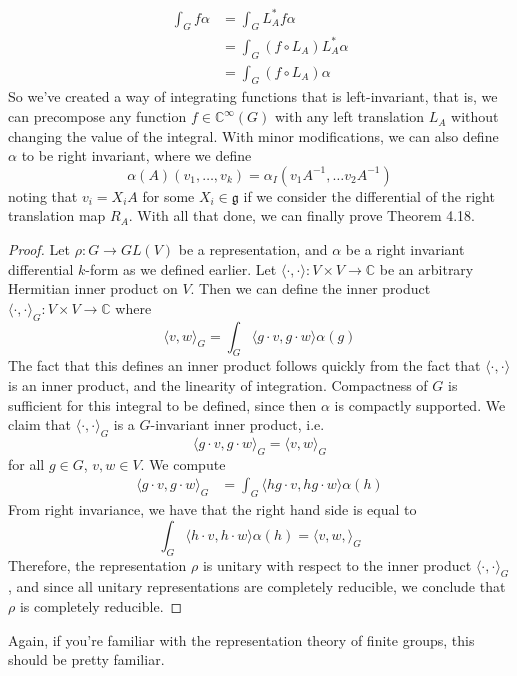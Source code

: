 \documentclass[psamsfonts]{amsart}
\theoremstyle{definition}
\theoremstyle{remark}
\newcommand{\C}{\mathbb{C}}
\newcommand{\g}{\mathfrak{g}}
\newcommand{\inv}{^{-1}}
\begin{document}
\begin{align*}
\int_G f\alpha &= \int_G L_A^*f\alpha \\
&= \int_G (f \circ L_A)L^*_A\alpha \\
&= \int_G (f \circ L_A)\alpha
\end{align*}
So we've created a way of integrating functions that is left-invariant, that is, we can precompose any function $f \in \C^\infty(G)$ with any left translation $L_A$ without changing the value of the integral. With minor modifications, we can also define $\alpha$ to be right invariant, where we define
$$\alpha(A)(v_1, \ldots, v_k) = \alpha_I(v_1A\inv, \ldots v_2A\inv) $$ 
noting that $v_i = X_iA$ for some $X_i \in \g$ if we consider the differential of the right translation map $R_A$. With all that done, we can finally prove Theorem 4.18.
\begin{proof}
Let $\rho: G \to GL(V)$ be a representation, and $\alpha$ be a right invariant differential $k$-form as we defined earlier. Let $\langle \cdot, \cdot \rangle:V\times V \to \C$ be an arbitrary Hermitian inner product on $V$. Then we can define the inner product $\langle \cdot, \cdot \rangle_G: V\times V \to \C$ where
$$\langle v, w \rangle_G = \int_G \langle g \cdot v, g \cdot w\rangle \alpha(g) $$
The fact that this defines an inner product follows quickly from the fact that $\langle \cdot, \cdot \rangle$ is an inner product, and the linearity of integration. Compactness of $G$ is sufficient for this integral to be defined, since then $\alpha$ is compactly supported. We claim that $\langle \cdot, \cdot \rangle_G$ is a $G$-invariant inner product, i.e.
$$\langle g\cdot v, g\cdot w \rangle_G = \langle v, w \rangle_G $$
for all $g \in G$, $v,w \in V$. We compute
\begin{align*}
\langle g\cdot v, g \cdot w\rangle_G &= \int_G \langle hg\cdot v, hg \cdot w \rangle \alpha(h)
\end{align*}
From right invariance, we have that the right hand side is equal to
$$\int_G \langle h\cdot v, h \cdot w \rangle\alpha(h) = \langle v, w ,\rangle_G $$
Therefore, the representation $\rho$ is unitary with respect to the inner product $\langle \cdot, \cdot \rangle_G$, and since all unitary representations are completely reducible, we conclude that $\rho$ is completely reducible.
\end{proof}

Again, if you're familiar with the representation theory of finite groups, this should be pretty familiar.
\end{document}
